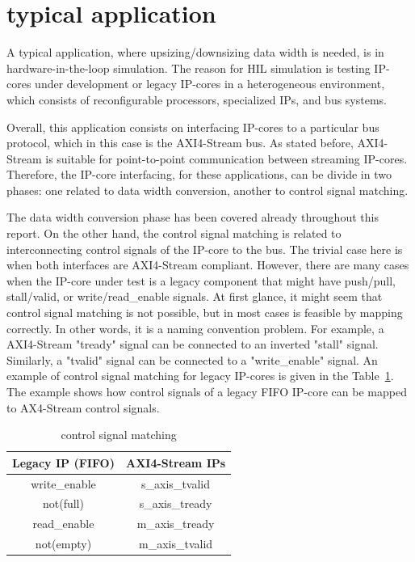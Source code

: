 \documentclass[10pt, conference, compsocconf]{IEEEtran}
\begin{document}
\section{typical application}

A typical application, where upsizing/downsizing data width is needed, is in hardware-in-the-loop simulation. The reason for HIL simulation is testing IP-cores under development or legacy IP-cores in a heterogeneous environment, which consists of reconfigurable processors, specialized IPs, and bus systems. 

Overall, this application consists on interfacing IP-cores to a particular bus protocol, which in this case is the AXI4-Stream bus. As stated before, AXI4-Stream is suitable for point-to-point communication between streaming IP-cores. Therefore, the IP-core interfacing, for these applications, can be divide in two phases: one related to data width conversion, another to control signal matching.

The data width conversion phase has been covered already throughout this report. On the other hand, the control signal matching is related to interconnecting control signals of the
IP-core to the bus. The trivial case here is when both interfaces are AXI4-Stream compliant. However, there are many cases when the IP-core under test is a legacy component that might
have push/pull, stall/valid, or write/read\_enable signals. At first glance, it might seem that control signal matching is not possible, but in most cases is feasible by mapping correctly. In other words, it is a naming convention problem. For example, a AXI4-Stream "tready" signal can be connected to an inverted "stall" signal. Similarly, a "tvalid" signal can be connected to a "write\_enable" signal. An example of control signal matching for legacy IP-cores is given in the Table~\ref{control_signal_matching}. The example shows how control signals of a legacy FIFO IP-core can be mapped to AX4-Stream control signals.

\begin{table}[!t]
	\caption{control signal matching}
    \label{control_signal_matching}
    \centering
    \begin{tabular}{ | c | c |}
    \hline
Legacy IP (FIFO) & AXI4-Stream IPs \\ \hline \hline
write\_enable  & s\_axis\_tvalid  \\ \hline
not(full)  & s\_axis\_tready  \\ \hline
read\_enable  & m\_axis\_tready  \\ \hline
not(empty) & m\_axis\_tvalid\\ \hline
    \end{tabular}
\end{table}
\end{document}
